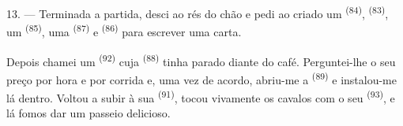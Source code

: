 13. --- Terminada a partida, desci ao rés do chão e pedi ao criado um
 \textsuperscript{(84)},  \textsuperscript{(83)}, um
 \textsuperscript{(85)}, uma  \textsuperscript{(87)} e
 \textsuperscript{(86)} para escrever uma carta.

Depois chamei um  \textsuperscript{(92)} cuja 
\textsuperscript{(88)} tinha parado diante do café. Perguntei-lhe o seu preço
por hora e por corrida e, uma vez de acordo, abriu-me a
 \textsuperscript{(89)} e instalou-me lá dentro. Voltou a subir
à sua  \textsuperscript{(91)}, tocou vivamente os cavalos com o seu
 \textsuperscript{(93)}, e lá fomos dar um passeio delicioso.
\VUsaut{6.0mm}
\VUfilet{22mm}
